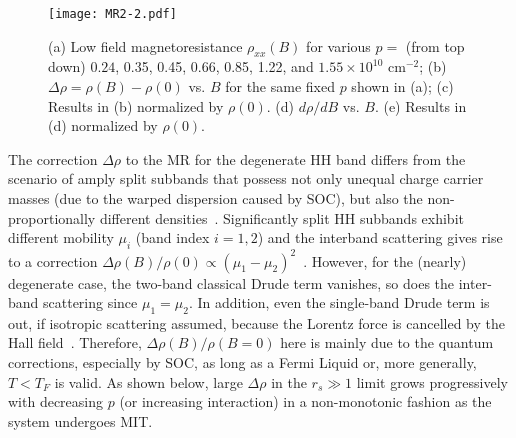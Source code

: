 \documentclass[twocolumn,secnumarabic,amssymb, nobibnotes, aps, prd]{revtex4-1}
\begin{document}
\begin{figure} [b]
\texttt{[image: MR2-2.pdf]}

\caption{\label{fig:weakB} (a) Low field magnetoresistance $\rho_{xx}(B)$ for various $p=$ (from top down) $0.24$, 0.35, 0.45, 0.66, 0.85, 1.22, and $1.55\times10^{10}$ cm$^{-2}$; (b) $\Delta\rho=\rho(B)-\rho(0)$ vs. $B$ for the same fixed $p$ shown in (a); (c) Results in (b) normalized by $\rho(0)$. (d) $d\rho/dB$ vs. $B$. (e) Results in (d) normalized by $\rho(0)$.}
\end{figure}

The correction $\Delta\rho$ to the MR for the degenerate HH band differs from the scenario of amply split subbands that possess not only unequal charge carrier masses (due to the warped dispersion caused by SOC), but also the non-proportionally different densities~\cite{SOI0,winkler}. Significantly split HH subbands exhibit different mobility $\mu_i$ (band index $i=1,2$) and the interband scattering gives rise to a correction $\Delta\rho(B)/\rho(0)\propto(\mu_1-\mu_2)^2$~\cite{interbandE}. However, for the (nearly) degenerate case, the two-band classical Drude term vanishes, so does the inter-band scattering since $\mu_1=\mu_2$. In addition, even the single-band Drude term is out, if isotropic scattering assumed, because the Lorentz force is cancelled by the Hall field~\cite{interbandE}. Therefore, $\Delta\rho(B)/\rho(B=0)$ here is mainly due to the quantum corrections, especially by SOC, as long as a Fermi Liquid or, more generally, $T<T_F$ is valid. As shown below, large $\Delta\rho$ in the $r_s\gg1$ limit grows progressively with decreasing $p$ (or increasing interaction) in a non-monotonic fashion as the system undergoes MIT.
\end{document}

